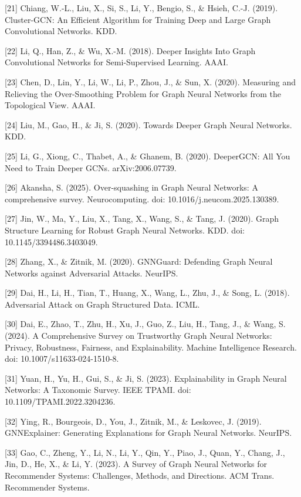 {[}21{]} Chiang, W.-L., Liu, X., Si, S., Li, Y., Bengio, S., \& Hsieh, C.-J. (2019). Cluster-GCN: An Efficient Algorithm for Training Deep and Large Graph Convolutional Networks. KDD.

{[}22{]} Li, Q., Han, Z., \& Wu, X.-M. (2018). Deeper Insights Into Graph Convolutional Networks for Semi-Supervised Learning. AAAI.

{[}23{]} Chen, D., Lin, Y., Li, W., Li, P., Zhou, J., \& Sun, X. (2020). Measuring and Relieving the Over-Smoothing Problem for Graph Neural Networks from the Topological View. AAAI.

{[}24{]} Liu, M., Gao, H., \& Ji, S. (2020). Towards Deeper Graph Neural Networks. KDD.

{[}25{]} Li, G., Xiong, C., Thabet, A., \& Ghanem, B. (2020). DeeperGCN: All You Need to Train Deeper GCNs. arXiv:2006.07739.

{[}26{]} Akansha, S. (2025). Over-squashing in Graph Neural Networks: A comprehensive survey. Neurocomputing. doi: 10.1016/j.neucom.2025.130389.

{[}27{]} Jin, W., Ma, Y., Liu, X., Tang, X., Wang, S., \& Tang, J. (2020). Graph Structure Learning for Robust Graph Neural Networks. KDD. doi: 10.1145/3394486.3403049.

{[}28{]} Zhang, X., \& Zitnik, M. (2020). GNNGuard: Defending Graph Neural Networks against Adversarial Attacks. NeurIPS.

{[}29{]} Dai, H., Li, H., Tian, T., Huang, X., Wang, L., Zhu, J., \& Song, L. (2018). Adversarial Attack on Graph Structured Data. ICML.

{[}30{]} Dai, E., Zhao, T., Zhu, H., Xu, J., Guo, Z., Liu, H., Tang, J., \& Wang, S. (2024). A Comprehensive Survey on Trustworthy Graph Neural Networks: Privacy, Robustness, Fairness, and Explainability. Machine Intelligence Research. doi: 10.1007/s11633-024-1510-8.

{[}31{]} Yuan, H., Yu, H., Gui, S., \& Ji, S. (2023). Explainability in Graph Neural Networks: A Taxonomic Survey. IEEE TPAMI. doi: 10.1109/TPAMI.2022.3204236.

{[}32{]} Ying, R., Bourgeois, D., You, J., Zitnik, M., \& Leskovec, J. (2019). GNNExplainer: Generating Explanations for Graph Neural Networks. NeurIPS.

{[}33{]} Gao, C., Zheng, Y., Li, N., Li, Y., Qin, Y., Piao, J., Quan, Y., Chang, J., Jin, D., He, X., \& Li, Y. (2023). A Survey of Graph Neural Networks for Recommender Systems: Challenges, Methods, and Directions. ACM Trans. Recommender Systems.

